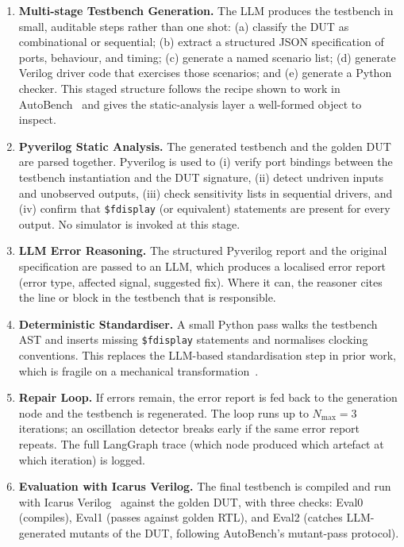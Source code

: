 \documentclass[11pt,a4paper, titlepage=false]{scrreprt}
\begin{document}
\begin{enumerate}[itemsep=3pt]
    \item \textbf{Multi-stage Testbench Generation.} The LLM produces the testbench in small,
    auditable steps rather than one shot: (a) classify the DUT as combinational or sequential;
    (b) extract a structured JSON specification of ports, behaviour, and timing; (c) generate
    a named scenario list; (d) generate Verilog driver code that exercises those scenarios; and
    (e) generate a Python checker. This staged structure follows the recipe shown to work in
    AutoBench~\cite{qiu2024autobench} and gives the static-analysis layer a well-formed object
    to inspect.

    \item \textbf{Pyverilog Static Analysis.} The generated testbench and the golden DUT are
    parsed together. Pyverilog is used to (i) verify port bindings between the testbench
    instantiation and the DUT signature, (ii) detect undriven inputs and unobserved outputs,
    (iii) check sensitivity lists in sequential drivers, and (iv) confirm that
    \texttt{\$fdisplay} (or equivalent) statements are present for every output. No simulator is
    invoked at this stage.

    \item \textbf{LLM Error Reasoning.} The structured Pyverilog report and the original
    specification are passed to an LLM, which produces a localised error report
    (error type, affected signal, suggested fix). Where it can, the reasoner cites the line or
    block in the testbench that is responsible.

    \item \textbf{Deterministic Standardiser.} A small Python pass walks the testbench AST and
    inserts missing \texttt{\$fdisplay} statements and normalises clocking conventions. This
    replaces the LLM-based standardisation step in prior work, which is fragile on a mechanical
    transformation~\cite{qiu2024autobench}.

    \item \textbf{Repair Loop.} If errors remain, the error report is fed back to the
    generation node and the testbench is regenerated. The loop runs up to $N_{\max} = 3$
    iterations; an oscillation detector breaks early if the same error report repeats. The full
    LangGraph trace (which node produced which artefact at which iteration) is logged.

    \item \textbf{Evaluation with Icarus Verilog.} The final testbench is compiled and run with
    Icarus Verilog~\cite{blocklove2023chipchat} against the golden DUT, with three checks:
    Eval0 (compiles), Eval1 (passes against golden RTL), and Eval2 (catches LLM-generated
    mutants of the DUT, following AutoBench's mutant-pass protocol).
\end{enumerate}
\end{document}
